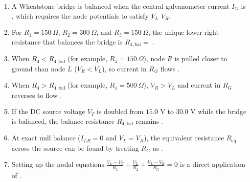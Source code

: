 \documentclass[10pt,letterpaper]{article}
\begin{document}
\begin{enumerate}
  \item A Wheatstone bridge is balanced when the central galvanometer current $I_G$ is \underline{\hspace{1.8in}}, which requires the node potentials to satisfy $V_L$ \underline{\hspace{1.8in}} $V_R$.
  \item For $R_1 = 150\ \Omega$, $R_2 = 300\ \Omega$, and $R_3 = 150\ \Omega$, the unique lower-right resistance that balances the bridge is $R_{4,\text{bal}} =$ \underline{\hspace{1.8in}}.
  \item When $R_4 < R_{4,\text{bal}}$ (for example, $R_4 = 150\ \Omega$), node $R$ is pulled closer to ground than node $L$ ($V_R < V_L$), so current in $R_G$ flows \underline{\hspace{1.8in}}.
  \item When $R_4 > R_{4,\text{bal}}$ (for example, $R_4 = 500\ \Omega$), $V_R > V_L$ and current in $R_G$ reverses to flow \underline{\hspace{1.8in}}.
  \item If the DC source voltage $V_T$ is doubled from $15.0\text{ V}$ to $30.0\text{ V}$ while the bridge is balanced, the balance resistance $R_{4,\text{bal}}$ remains \underline{\hspace{1.8in}}.
  \item At exact null balance ($I_{LR} = 0$ and $V_L = V_R$), the equivalent resistance $R_{\text{eq}}$ across the source can be found by treating $R_G$ as \underline{\hspace{1.8in}}.
  \item Setting up the nodal equations $\frac{V_L - V_T}{R_1} + \frac{V_L}{R_2} + \frac{V_L - V_R}{R_G} = 0$ is a direct application of \underline{\hspace{1.8in}}.
\end{enumerate}
\end{document}
